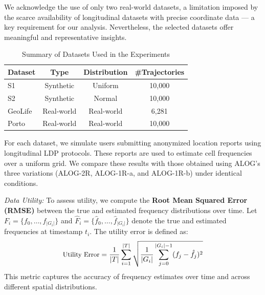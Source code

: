 We acknowledge the use of only two real-world datasets, a limitation imposed by the scarce availability of longitudinal datasets with precise coordinate data — a key requirement for our analysis. Nevertheless, the selected datasets offer meaningful and representative insights. 
% 
\begin{table}[tb]
\centering
\caption{Summary of Datasets Used in the Experiments}
\begin{tabular}{l|c|c|c}
\toprule
\textbf{Dataset} & \textbf{Type} & \textbf{Distribution} & \textbf{\#Trajectories} \\
\midrule
S1 & Synthetic & Uniform & 10,000  \\
S2 & Synthetic & Normal & 10,000  \\
GeoLife & Real-world & Real-world & 6,281  \\
Porto & Real-world & Real-world & 10,000  \\
\bottomrule
\end{tabular}
\label{tab:datasets}
\end{table}
% 
For each dataset, we simulate users submitting anonymized location reports using longitudinal LDP protocols. These reports are used to estimate cell frequencies over a uniform grid. We compare these results with those obtained using ALOG's three variations (ALOG-2R, ALOG-1R-a, and ALOG-1R-b) under identical conditions. 

\textit{Data Utility:}  
To assess utility, we compute the \textbf{Root Mean Squared Error (RMSE)} between the true and estimated frequency distributions over time. Let \( F_i = \{f_0, \dots, f_{|G_i|}\} \) and \( \hat{F}_i = \{\hat{f}_0, \dots, \hat{f}_{|G_i|}\} \) denote the true and estimated frequencies at timestamp \( t_i \). The utility error is defined as:
% 
\begin{equation}
\small
\label{eq:utility_error}
\text{Utility Error} = \frac{1}{|T|} \sum_{i=1}^{|T|} \sqrt{ \frac{1}{|G_i|} \sum_{j=0}^{|G_i|-1} (f_j - \hat{f}_j)^2 }
\end{equation}
% 
This metric captures the accuracy of frequency estimates over time and across different spatial distributions.



